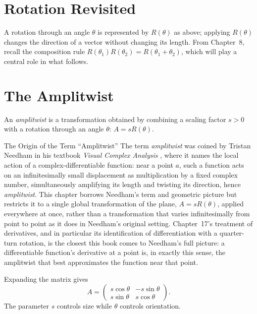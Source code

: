 \section{Rotation Revisited}

A rotation through an angle $\theta$ is represented by $R(\theta)$ as
above; applying $R(\theta)$ changes the direction of a vector without
changing its length. From Chapter~8, recall the composition rule
$R(\theta_1)R(\theta_2) = R(\theta_1+\theta_2)$, which will play a
central role in what follows.

\section{The Amplitwist}

\begin{definition}
An \emph{amplitwist} is a transformation obtained by combining a scaling
factor $s>0$ with a rotation through an angle $\theta$: $A = sR(\theta)$.
\end{definition}

\begin{historicalnote}{The Origin of the Term ``Amplitwist''}
The term \emph{amplitwist} was coined by Tristan Needham in his textbook
\emph{Visual Complex Analysis} \cite{needham1997}, where it names the
local action of a complex-differentiable function: near a point $a$, such
a function acts on an infinitesimally small displacement as multiplication
by a fixed complex number, simultaneously amplifying its length and
twisting its direction, hence \emph{amplitwist}. This chapter borrows
Needham's term and geometric picture but restricts it to a single global
transformation of the plane, $A = sR(\theta)$, applied everywhere at once,
rather than a transformation that varies infinitesimally from point to
point as it does in Needham's original setting. Chapter~17's treatment of
derivatives, and in particular its identification of differentiation with
a quarter-turn rotation, is the closest this book comes to Needham's
full picture: a differentiable function's derivative at a point is, in
exactly this sense, the amplitwist that best approximates the function
near that point.
\end{historicalnote}

Expanding the matrix gives
\[
A=
\begin{pmatrix}
s\cos\theta & -s\sin\theta\\
s\sin\theta & s\cos\theta
\end{pmatrix}.
\]
The parameter $s$ controls size while $\theta$ controls orientation.

